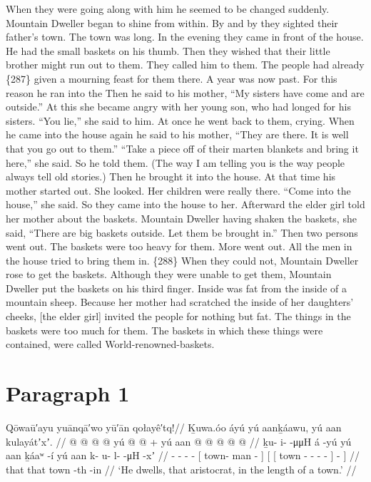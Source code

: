 When they were going along with him he seemed to be changed suddenly.
Mountain Dweller began to shine from within.
By and by they sighted their father’s town.
The town was long.
In the evening they came in front of the house.
He had the small baskets on his thumb.
Then they wished that their little brother might run out to them.
They called him to them.
The people had already
\{287\}
given a mourning feast for them there.
A year was now past.
For this reason he ran into the 
Then he said to his mother,
“My sisters have come and are outside.”
At this she became angry with her young son, who had longed for his sisters.
“You lie,”
she said to him.
At once he went back to them, crying.
When he came into the house again he said to his mother,
“They are there.
It is well that you go out to them.”
“Take a piece off of their marten blankets and bring it here,”
she said.
So he told them.
(The way I am telling you is the way people always tell old stories.)
Then he brought it into the house.
At that time his mother started out.
She looked.
Her children were really there.
“Come into the house,” she said.
So they came into the house to her.
Afterward the elder girl told her mother about the baskets.
Mountain Dweller having shaken the baskets, she said,
“There are big baskets outside.
Let them be brought in.”
Then two persons went out.
The baskets were too heavy for them.
More went out.
All the men in the house tried to bring them in.
\{288\}
When they could not, Mountain Dweller rose to get the baskets.
Although they were unable to get them, Mountain Dweller put the baskets on his third finger.
Inside was fat from the inside of a mountain sheep.
Because her mother had scratched the inside of her daughters’ cheeks, [the elder girl] invited the people for nothing but fat.
The things in the baskets were too much for them.
The baskets in which these things were contained, were called World-renowned-baskets.

\clearpage
\section{Paragraph 1}\label{sec:92-para-1}

\ex\label{ex:92-1-aristocrat-dwells-in-length-of-town}%
%
\begingl
	\glpreamble	Qōwaū′ayu yuānqā′wo yū′ān qołayê′tq!//
	\glpreamble	Ḵuwa.óo áyú yú aanḵáawu, yú aan kulayátʼxʼ. //
	\gla	{} @ {} @ {} @ {}  @ {}
		{} yú  @ {} @ {} {} +
		{} {} yú aan  @ {} @ {} @ {} @ {} @ {} {} {} {} //
	\glb	ḵu- i-  -μμH á -yú
		{} yú aan ḵáaʷ -í {}
		{} {} yú aan k- u- l-  -μH {} {} -xʼ {} //
	\glc	{}- -  -  -
		{}[  town- man - {}]
		{}[ {}[  town
			- - -  - \· {}]
			- {}] //
	\gld	{} {} {} {}  {}
		{} that  {} {} {}
		{} {} that town  {} {} {} {} -th {}
			-in {} //
	\glft	‘He dwells, that aristocrat, in the length of a town.’
		//
\endgl
\xe

